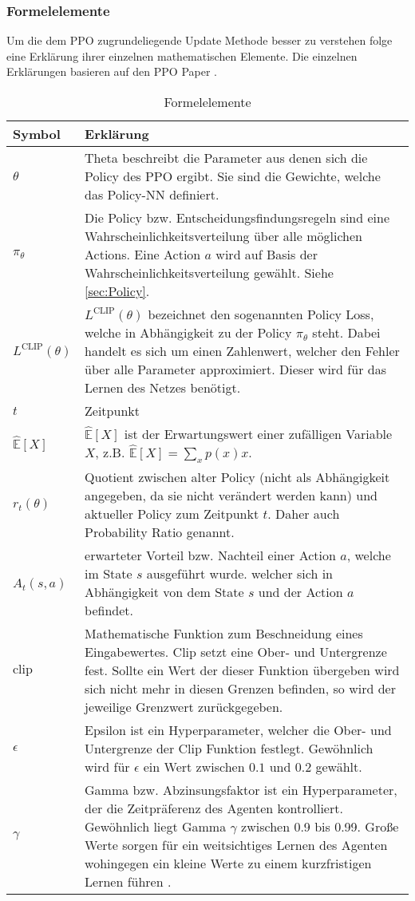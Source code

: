 \subsubsection{Formelelemente}
Um die dem PPO zugrundeliegende Update Methode besser zu verstehen folge eine Erklärung ihrer einzelnen mathematischen Elemente.
Die einzelnen Erklärungen basieren auf den PPO Paper \cite{PPO}.
\begin{longtable}[h]{|p{4cm}|p{\linewidth - 5cm}|}
	\caption{Formelelemente}
	\label{tab:FormelelementePPO} 
	\endfirsthead
	\endhead
	\hline
	Symbol & Erklärung \\
	\hline
	$\theta$ & Theta beschreibt die Parameter aus denen sich die Policy des PPO ergibt. Sie sind die Gewichte, welche das Policy-NN definiert. \\
	\hline
	$\pi_{\theta}$ & Die Policy bzw. Entscheidungsfindungsregeln sind eine Wahrscheinlichkeitsverteilung über alle möglichen Actions. Eine Action $a$ wird auf Basis der Wahrscheinlichkeitsverteilung gewählt. Siehe \ref{sec:Policy}. \cite[Summary of Notation S. xvi]{Sutton1998} \\
	\hline
	$L^\text{CLIP} (\theta)$ & $L^\text{CLIP} (\theta)$ bezeichnet den sogenannten Policy Loss, welche in Abhängigkeit zu der Policy $\pi_{\theta}$ steht. Dabei handelt es sich um einen Zahlenwert, welcher den Fehler über alle Parameter approximiert. Dieser wird für das Lernen des Netzes benötigt. \\
	\hline
	$t$ & Zeitpunkt \\
	\hline
	$\mathbb{\hat{E}}[X]$ & $\mathbb{\hat{E}}[X]$ ist der Erwartungswert einer zufälligen Variable $X$, z.B. $\mathbb{\hat{E}}[X] = \sum_{x}p(x)x$. \cite[Summary of Notation S. xv]{Sutton1998} \\
	\hline
	$r_{t}(\theta)$ & Quotient zwischen alter Policy (nicht als Abhängigkeit angegeben, da sie nicht verändert werden kann) und aktueller Policy zum Zeitpunkt $t$. Daher auch Probability Ratio genannt. \\
	\hline
	$\hat{A}_{t}(s, a)$ & erwarteter Vorteil bzw. Nachteil einer Action $a$, welche im State $s$ ausgeführt wurde. welcher sich in Abhängigkeit von dem State $s$ und der Action $a$ befindet. \\
	\hline
	$\text{clip}$ & Mathematische Funktion zum Beschneidung eines Eingabewertes. Clip setzt eine Ober- und Untergrenze fest. Sollte ein Wert der dieser Funktion übergeben wird sich nicht mehr in diesen Grenzen befinden, so wird der jeweilige Grenzwert zurückgegeben. \\
	\hline
	$\epsilon$ & Epsilon ist ein Hyperparameter, welcher die Ober- und Untergrenze der Clip Funktion festlegt. Gewöhnlich wird für $\epsilon$ ein Wert zwischen $0.1$ und $0.2$ gewählt. \\
	\hline
	$\gamma$ \label{sign:Gamma} & Gamma bzw. Abzinsungsfaktor ist ein Hyperparameter, der die Zeitpräferenz des Agenten kontrolliert. Gewöhnlich liegt Gamma $\gamma$ zwischen 0.9 bis 0.99. Große Werte sorgen für ein weitsichtiges Lernen des Agenten wohingegen ein kleine Werte zu einem kurzfristigen Lernen führen \cite[S. 43 bzw. Summary of Notation S. xv]{Sutton1998}. \\
	\hline
\end{longtable}

